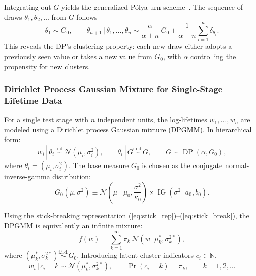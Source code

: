 \documentclass[a4paper,fleqn,longmktitle]{cas-sc}
\DeclareMathOperator{\DP}{DP}
\DeclareMathOperator{\IG}{IG}
\newcommand{\given}{\,|\,}
\newcommand{\iid}{\overset{\text{i.i.d.}}{\sim}}
\newcommand{\normal}{\mathcal{N}}
\newcommand{\N}{\mathbb{N}}
\begin{document}
Integrating out $G$ yields the generalized P\'{o}lya urn scheme~\cite{Blackwell1973}. The sequence of draws $\theta_1, \theta_2, \ldots$ from $G$ follows
\begin{equation}\label{eq:polya}
    \theta_1 \sim G_0, \qquad
    \theta_{n+1} \given \theta_1, \ldots, \theta_n \sim
    \frac{\alpha}{\alpha + n}\,G_0 + \frac{1}{\alpha + n}\sum_{i=1}^{n} \delta_{\theta_i}.
\end{equation}
This reveals the DP's clustering property: each new draw either adopts a previously seen value or takes a new value from $G_0$, with $\alpha$ controlling the propensity for new clusters.

\subsubsection{Dirichlet Process Gaussian Mixture for Single-Stage Lifetime Data}

For a single test stage with $n$ independent units, the log-lifetimes $w_1, \ldots, w_n$ are modeled using a Dirichlet process Gaussian mixture (DPGMM). In hierarchical form:
\begin{equation}\label{eq:dpgmm}
    w_i \given \theta_i \iid \normal(\mu_i, \sigma_i^2), \qquad
    \theta_i \given G \iid G, \qquad
    G \sim \DP(\alpha, G_0),
\end{equation}
where $\theta_i = (\mu_i, \sigma_i^2)$. The base measure $G_0$ is chosen as the conjugate normal-inverse-gamma distribution:
\begin{equation}\label{eq:base_measure}
    G_0(\mu, \sigma^2) \equiv \normal\!\left(\mu \;\Big\vert\; \mu_0, \frac{\sigma^2}{\kappa_0}\right) \times \IG(\sigma^2 \given a_0, b_0).
\end{equation}

Using the stick-breaking representation (\ref{eq:stick_rep})--(\ref{eq:stick_break}), the DPGMM is equivalently an infinite mixture:
\begin{equation}\label{eq:dpgmm_inf}
    f(w) = \sum_{k=1}^{\infty} \pi_k \,\normal(w \given \mu_k^*, \sigma_k^{2*}),
\end{equation}
where $(\mu_k^*, \sigma_k^{2*}) \iid G_0$. Introducing latent cluster indicators $c_i \in \N$,
\begin{equation}\label{eq:dpgmm_cluster}
    w_i \given c_i = k \sim \normal(\mu_k^*, \sigma_k^{2*}), \qquad
    \Pr(c_i = k) = \pi_k, \qquad k = 1, 2, \ldots
\end{equation}
\end{document}
